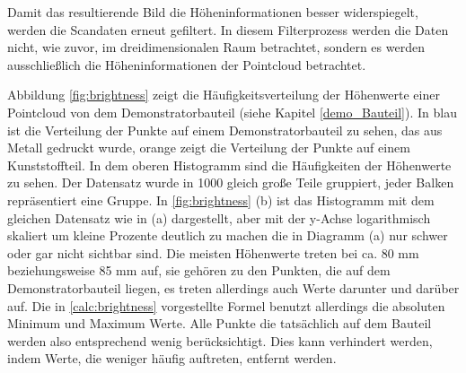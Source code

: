 Damit das resultierende Bild die Höheninformationen besser widerspiegelt, werden 
die Scandaten erneut gefiltert. In diesem Filterprozess werden die Daten nicht, 
wie zuvor, im dreidimensionalen Raum betrachtet, sondern es werden ausschließlich 
die Höheninformationen der Pointcloud betrachtet.

Abbildung \ref*{fig:brightness} zeigt die Häufigkeitsverteilung der Höhenwerte einer
Pointcloud von dem Demonstratorbauteil (siehe Kapitel \ref{demo_Bauteil}). 
In blau ist die Verteilung der Punkte auf 
einem Demonstratorbauteil zu sehen, das aus Metall gedruckt wurde, orange zeigt die 
Verteilung der Punkte auf einem Kunststoffteil.
In dem oberen Histogramm 
sind die Häufigkeiten der Höhenwerte zu sehen. Der Datensatz wurde in 1000 gleich große
Teile gruppiert, jeder Balken repräsentiert eine Gruppe.
In \ref*{fig:brightness} (b) ist das Histogramm mit dem gleichen Datensatz wie in (a) 
dargestellt, aber mit der y-Achse 
logarithmisch skaliert um kleine Prozente deutlich zu machen die in Diagramm
(a) nur schwer oder gar nicht sichtbar sind. 
Die meisten Höhenwerte treten bei ca. 80 mm beziehungsweise 85 mm auf, 
sie gehören zu den Punkten, die auf dem Demonstratorbauteil liegen, 
es treten allerdings auch Werte darunter und darüber auf. 
Die in \ref*{calc:brightness} vorgestellte Formel benutzt allerdings 
die absoluten Minimum und Maximum Werte.
Alle Punkte die tatsächlich auf dem Bauteil werden also entsprechend wenig
berücksichtigt. Dies kann verhindert werden, indem Werte, die weniger häufig 
auftreten, entfernt werden.

